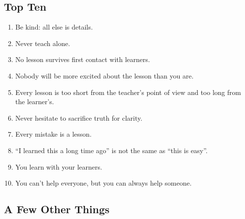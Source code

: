 
\subsection{Top Ten}\label{top-ten}

\begin{enumerate}
\item
  Be kind: all else is details.
\item
  Never teach alone.
\item
  No lesson survives first contact with learners.
\item
  Nobody will be more excited about the lesson than you are.
\item
  Every lesson is too short from the teacher's point of view and too
  long from the learner's.
\item
  Never hesitate to sacrifice truth for clarity.
\item
  Every mistake is a lesson.
\item
  ``I learned this a long time ago'' is not the same as ``this is
  easy''.
\item
  You learn with your learners.
\item
  You can't help everyone, but you can always help someone.
\end{enumerate}

\subsection{A Few Other Things}\label{a-few-other-things}

